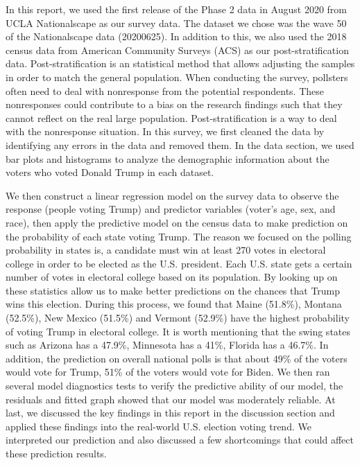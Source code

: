 \documentclass[
]{article}
\begin{document}
In this report, we used the first release of the Phase 2 data in August
2020 from UCLA Nationalscape as our survey data. The dataset we chose
was the wave 50 of the Nationalscape data (20200625). In addition to
this, we also used the 2018 census data from American Community Surveys
(ACS) as our post-stratification data. Post-stratification is an
statistical method that allows adjusting the samples in order to match
the general population. When conducting the survey, pollsters often need
to deal with nonresponse from the potential respondents. These
nonresponses could contribute to a bias on the research findings such
that they cannot reflect on the real large population.
Post-stratification is a way to deal with the nonresponse situation. In
this survey, we first cleaned the data by identifying any errors in the
data and removed them. In the data section, we used bar plots and
histograms to analyze the demographic information about the voters who
voted Donald Trump in each dataset.

We then construct a linear regression model on the survey data to
observe the response (people voting Trump) and predictor variables
(voter's age, sex, and race), then apply the predictive model on the
census data to make prediction on the probability of each state voting
Trump. The reason we focused on the polling probability in states is, a
candidate must win at least 270 votes in electoral college in order to
be elected as the U.S. president. Each U.S. state gets a certain number
of votes in electoral college based on its population. By looking up on
these statistics allow us to make better predictions on the chances that
Trump wins this election. During this process, we found that Maine
(51.8\%), Montana (52.5\%), New Mexico (51.5\%) and Vermont (52.9\%)
have the highest probability of voting Trump in electoral college. It is
worth mentioning that the swing states such as Arizona has a 47.9\%,
Minnesota has a 41\%, Florida has a 46.7\%. In addition, the prediction
on overall national polls is that about 49\% of the voters would vote
for Trump, 51\% of the voters would vote for Biden. We then ran several
model diagnostics tests to verify the predictive ability of our model,
the residuals and fitted graph showed that our model was moderately
reliable. At last, we discussed the key findings in this report in the
discussion section and applied these findings into the real-world U.S.
election voting trend. We interpreted our prediction and also discussed
a few shortcomings that could affect these prediction results.
\end{document}
